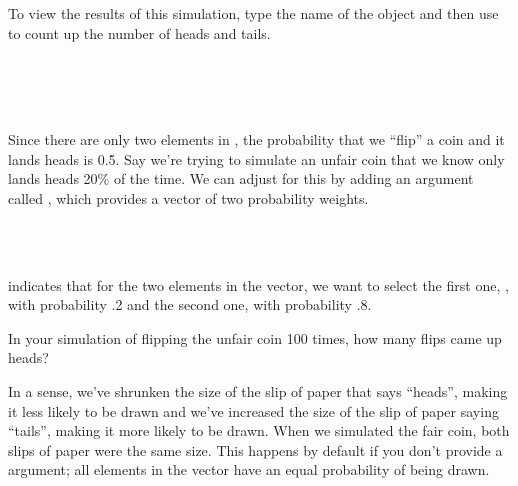 \documentclass[11pt]{article}
\begin{document}
To view the results of this simulation, type the name of the object and then use \texttt{} to count up the number of heads and tails.

\ttfamily\noindent
\hlstd{}\hspace*{\fill}\\
\hlstd{}\hspace*{\fill}\\
\hlstd{}\hlkeyword{(}\hlkeyword{)}\hspace*{\fill}\\
\normalfont

Since there are only two elements in \texttt{}, the probability that we ``flip'' a coin and it lands heads is 0.5.  Say we're trying to simulate an unfair coin that we know only lands heads 20\% of the time.  We can adjust for this by adding an argument called \texttt{}, which provides a vector of two probability weights.

\ttfamily\noindent
\hlstd{}\hspace*{\fill}\\
\hlstd{}\hlassignement{\usebox{\hlnormalsizeboxlessthan}-}{\ }\hlkeyword{(}\hlkeyword{,}{\ }\hlargument{=}{\ }\hlkeyword{,}{\ }\hlargument{=}{\ }\hlkeyword{,}{\ }\hlargument{=}{\ }\hlkeyword{(}\hlkeyword{,}{\ }\hlkeyword{)}\hlkeyword{)}\hspace*{\fill}\\
\normalfont

\texttt{\hlargument{=}{\ }\hlkeyword{(}\hlkeyword{,}{\ }\hlkeyword{)}} indicates that for the two elements in the \texttt{} vector, we want to select the first one, \texttt{}, with probability .2 and the second one, \texttt{} with probability .8.

\begin{exercise}
In your simulation of flipping the unfair coin 100 times, how many flips came up heads?
\end{exercise}

In a sense, we've shrunken the size of the slip of paper that says ``heads'', making it less likely to be drawn and we've increased the size of the slip of paper saying ``tails'', making it more likely to be drawn.  When we simulated the fair coin, both slips of paper were the same size.  This happens by default if you don't provide a \texttt{} argument; all elements in the \texttt{} vector have an equal probability of being drawn.
\end{document}
